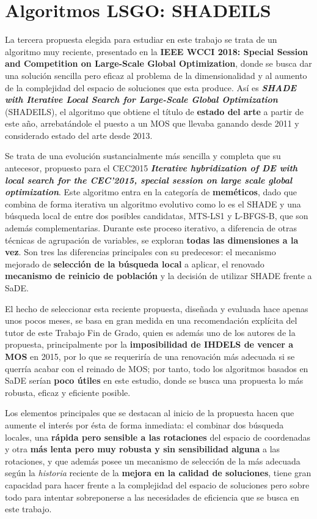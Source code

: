 \section{Algoritmos LSGO: SHADEILS}

La tercera propuesta elegida para estudiar en este trabajo se trata de un algoritmo muy reciente, presentado en la \textbf{IEEE WCCI 2018: Special Session and Competition on Large-Scale Global Optimization}\cite{WCCI-SHADEILS}, donde se busca dar una solución sencilla pero eficaz al problema de la dimensionalidad y al aumento de la complejidad del espacio de soluciones que esta produce. Así es \textbf{\textit{SHADE with Iterative Local Search for Large-Scale Global Optimization}}\cite{SHADEILS} (SHADEILS), el algoritmo que obtiene el título de \textbf{estado del arte} a partir de este año, arrebatándole el puesto a un MOS que llevaba ganando desde 2011 y considerado estado del arte desde 2013.

Se trata de una evolución sustancialmente más sencilla y completa que su antecesor, propuesto para el CEC2015 \textbf{\textit{Iterative hybridization of DE with local search for the CEC'2015, special session on large scale global optimization}}\cite{IHDELS}. Este algoritmo entra en la categoría de \textbf{meméticos}, dado que combina de forma iterativa un algoritmo evolutivo como lo es el SHADE\cite{SHADE} y una búsqueda local de entre dos posibles candidatas, MTS-LS1\cite{MTS-LSGO} y L-BFGS-B\cite{LBFGSB}, que son además complementarias. Durante este proceso iterativo, a diferencia de otras técnicas de agrupación de variables, se exploran \textbf{todas las dimensiones a la vez}. Son tres las diferencias principales con su predecesor: el mecanismo mejorado de \textbf{selección de la búsqueda local} a aplicar, el renovado \textbf{mecanismo de reinicio de población} y la decisión de utilizar SHADE frente a SaDE\cite{SaDE}.

El hecho de seleccionar esta reciente propuesta, diseñada y evaluada hace apenas unos pocos meses, se basa en gran medida en una recomendación explícita del tutor de este Trabajo Fin de Grado, quien es además uno de los autores de la propuesta, principalmente por la \textbf{imposibilidad de IHDELS de vencer a MOS} en 2015, por lo que se requeriría de una renovación más adecuada si se querría acabar con el reinado de MOS; por tanto, todo los algoritmos basados en SaDE serían \textbf{poco útiles} en este estudio, donde se busca una propuesta lo más robusta, eficaz y eficiente posible.

Los elementos principales que se destacan al inicio de la propuesta hacen que aumente el interés por ésta de forma inmediata: el combinar dos búsqueda locales, una \textbf{rápida pero sensible a las rotaciones} del espacio de coordenadas y otra \textbf{más lenta pero muy robusta y sin sensibilidad alguna} a las rotaciones, y que además posee un mecanismo de selección de la más adecuada según la \textit{historia} reciente de la \textbf{mejora en la calidad de soluciones}, tiene gran capacidad para hacer frente a la complejidad del espacio de soluciones pero sobre todo para intentar sobreponerse a las necesidades de eficiencia que se busca en este trabajo. 


